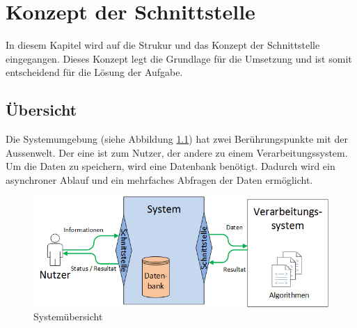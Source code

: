 %
%

\chapter{Konzept der Schnittstelle \resultAssignment{[R4]}}\label{chap.architektur}
In diesem Kapitel wird auf die Strukur und das Konzept der Schnittstelle eingegangen. Dieses Konzept legt die Grundlage für die Umsetzung und ist somit entscheidend für die Lösung der 
Aufgabe.

\section{Übersicht}\label{architektur_uebersicht}
Die Systemumgebung (siehe Abbildung \ref{fig:system_scope}) hat zwei Berührungspunkte mit der Aussenwelt. Der eine ist zum Nutzer, der andere zu einem Verarbeitungssystem. 
Um die Daten zu speichern, wird eine Datenbank benötigt. Dadurch wird ein asynchroner Ablauf und ein mehrfaches Abfragen der Daten ermöglicht.
\begin{figure}[h]
\centering
\includegraphics[scale=0.8]{images/visio/Systemscope.png}
\caption[Systemübersicht]{Systemübersicht \selfmade{}}
\label{fig:system_scope}
\end{figure}

